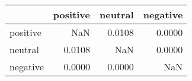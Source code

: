 \begin{tabular}{lrrr}
\toprule
 & positive & neutral & negative \\
\midrule
positive & NaN & 0.0108 & 0.0000 \\
neutral & 0.0108 & NaN & 0.0000 \\
negative & 0.0000 & 0.0000 & NaN \\
\bottomrule
\end{tabular}
